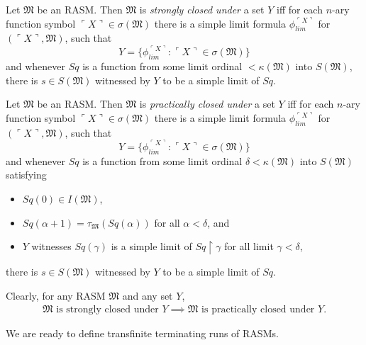 \documentclass[12pt]{article}
\numberwithin{equation}{section}
\begin{document}
\begin{defi}\label{def237}
Let $\mathfrak{M}$ be an RASM. Then $\mathfrak{M}$ is \emph{strongly closed under} a set $Y$ iff for each $n$-ary function symbol $\ulcorner X \urcorner \in \sigma(\mathfrak{M})$ there is a simple limit formula $\phi_{lim}^{\ulcorner X \urcorner}$ for $(\ulcorner X \urcorner, \mathfrak{M})$, such that 
\begin{equation*}
    Y = \{\phi_{lim}^{\ulcorner X \urcorner} : \ulcorner X \urcorner \in \sigma(\mathfrak{M})\}
\end{equation*}
and whenever $Sq$ is a function from some limit ordinal $< \kappa(\mathfrak{M})$ into $S(\mathfrak{M})$, there is $s \in S(\mathfrak{M})$ witnessed by $Y$ to be a simple limit of $Sq$.
\end{defi}

\begin{defi}\label{def238}
Let $\mathfrak{M}$ be an RASM. Then $\mathfrak{M}$ is \emph{practically closed under} a set $Y$ iff for each $n$-ary function symbol $\ulcorner X \urcorner \in \sigma(\mathfrak{M})$ there is a simple limit formula $\phi_{lim}^{\ulcorner X \urcorner}$ for $(\ulcorner X \urcorner, \mathfrak{M})$, such that 
\begin{equation*}
    Y = \{\phi_{lim}^{\ulcorner X \urcorner} : \ulcorner X \urcorner \in \sigma(\mathfrak{M})\}
\end{equation*}
and whenever $Sq$ is a function from some limit ordinal $\delta < \kappa(\mathfrak{M})$ into $S(\mathfrak{M})$ satisfying
\begin{itemize}
    \item $Sq(0) \in I(\mathfrak{M})$,
    \item $Sq(\alpha + 1) = \tau_{\mathfrak{M}}(Sq(\alpha))$ for all $\alpha < \delta$, and
    \item $Y$ witnesses $Sq(\gamma)$ is a simple limit of $Sq \restriction \gamma$ for all limit $\gamma < \delta$,
\end{itemize}
there is $s \in S(\mathfrak{M})$ witnessed by $Y$ to be a simple limit of $Sq$.
\end{defi}

Clearly, for any RASM $\mathfrak{M}$ and any set $Y$,
\begin{align*}
    \mathfrak{M} \text{ is strongly closed under } Y \implies \mathfrak{M} \text{ is practically closed under } Y \text{.}
\end{align*}

We are ready to define transfinite terminating runs of RASMs.
\end{document}
